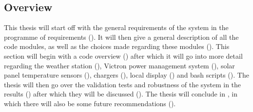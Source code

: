 \subsection{Overview}
This thesis will start off with the general requirements of the system in the programme of requirements (). It will then give a general description of all the code modules, as well as the choices made regarding these modules (). This section will begin with a code overview () after which it will go into more detail regarding the weather station (), Victron power management system (), solar panel temperature sensors (), chargers (), local display () and bash scripts (). The thesis will then go over the validation tests and robustness of the system in the results () after which they will be discussed (). The thesis will conclude in , in which there will also be some future recommendations ().